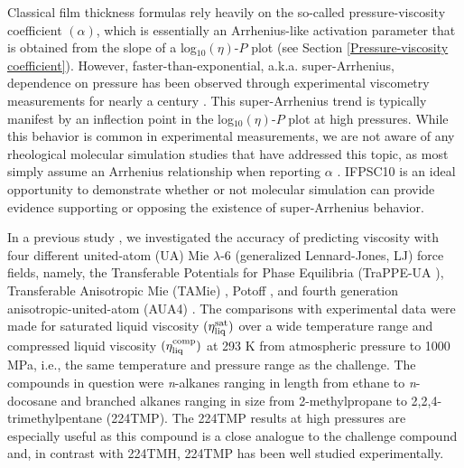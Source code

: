 \documentclass[preprint,review,12pt]{elsarticle}
\begin{document}
	Classical film thickness formulas rely heavily on the so-called pressure-viscosity coefficient $(\alpha)$, which is essentially an Arrhenius-like activation parameter that is obtained from the slope of a log$_{10}(\eta)$-$P$ plot (see Section \ref{Pressure-viscosity coefficient}). However, faster-than-exponential, a.k.a. super-Arrhenius, dependence on pressure has been observed through experimental viscometry measurements for nearly a century \cite{Bair2016}. This super-Arrhenius trend is typically manifest by an inflection point in the log$_{10}(\eta)$-$P$ plot at high pressures. While this behavior is common in experimental measurements, we are not aware of any rheological molecular simulation studies that have addressed this topic, as most simply assume an Arrhenius relationship when reporting $\alpha$ \cite{Mundy1996,McCabe2001,Liu2015}. IFPSC10 is an ideal opportunity to demonstrate whether or not molecular simulation can provide evidence supporting or opposing the existence of super-Arrhenius behavior.
	
	
	In a previous study \cite{Postdoc_3}, we investigated the accuracy of predicting viscosity with four different united-atom (UA) Mie $\lambda$-6 (generalized Lennard-Jones, LJ) force fields, namely, the Transferable Potentials for Phase Equilibria (TraPPE-UA \cite{TraPPE,Martin1999,TraPPEUA2}), Transferable Anisotropic Mie (TAMie) \cite{TAMie,Weidler2016}, Potoff \cite{Mie,Potoff_branched}, and fourth generation anisotropic-united-atom (AUA4) \cite{AUA4,Nieto2008}. The comparisons with experimental data were made for saturated liquid viscosity $(\eta_{\rm liq}^{\rm sat})$ over a wide temperature range and compressed liquid viscosity $(\eta_{\rm liq}^{\rm comp})$ at 293 K from atmospheric pressure to 1000 MPa, i.e., the same temperature and pressure range as the challenge. The compounds in question were \textit{n}-alkanes ranging in length from ethane to \textit{n}-docosane and branched alkanes ranging in size from 2-methylpropane to 2,2,4-trimethylpentane (224TMP). The 224TMP results at high pressures are especially useful as this compound is a close analogue to the challenge compound and, in contrast with 224TMH, 224TMP has been well studied experimentally.
	
\end{document}
